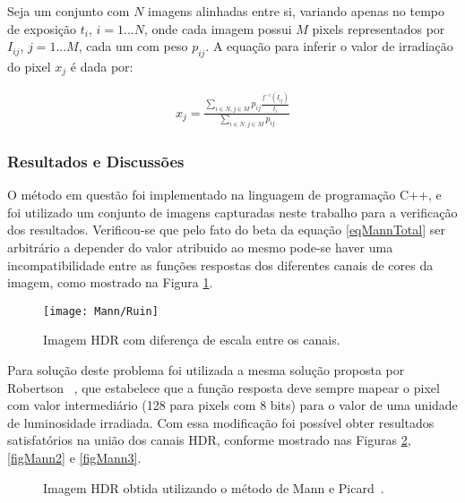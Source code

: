 Seja um conjunto com $N$ imagens alinhadas entre si, variando apenas no tempo de exposição $t_{i}$, $i = 1 ... N$, onde cada imagem possui $M$ pixels representados por $I_{ij}$, $j = 1... M$, cada um com peso $p_{ij}$. A equação para inferir o valor de irradiação do pixel $x_{j}$ é dada por:

\begin{align} \label{eqMannGeracao}
          x_{j} = \frac{\sum\limits_{i \in N, j \in M}{p_{ij}\frac{f^{-1}(I_{ij})}{t_{i}}}}{\sum\limits_{i \in N, j \in M}{p_{ij}}}
\end{align}

\subsubsection{Resultados e Discussões} \label{metodoMannResultado}

O método em questão foi implementado na linguagem de programação C++, e foi utilizado um conjunto de imagens capturadas neste trabalho para a verificação dos resultados. Verificou-se que pelo fato do beta da equação \ref{eqMannTotal} ser arbitrário  a depender do valor atribuido ao mesmo pode-se haver uma incompatibilidade entre as funções respostas dos diferentes canais de cores da imagem, como mostrado na Figura \ref{figMannFigErr}.

\begin{figure}[H]
  \centering
  \texttt{[image: Mann/Ruin]}
  \caption{Imagem HDR com diferença de escala entre os canais.}
  \label{figMannFigErr}
\end{figure}

Para solução deste problema foi utilizada a mesma solução proposta por Robertson \etal~\cite{robertson}, que estabelece que a função resposta deve sempre mapear o pixel com valor intermediário (128 para pixels com 8 bits) para o valor de uma unidade de luminosidade irradiada. Com essa modificação foi possível obter resultados satisfatórios na união dos canais HDR, conforme mostrado nas Figuras \ref{figMann1}, \ref{figMann2} e \ref{figMann3}.

\begin{figure}[H]
  \centering
  \quad %
  \caption{Imagem HDR obtida utilizando o método de Mann e Picard~\protect\cite{mann}.}
  \label{figMann1}
\end{figure}


